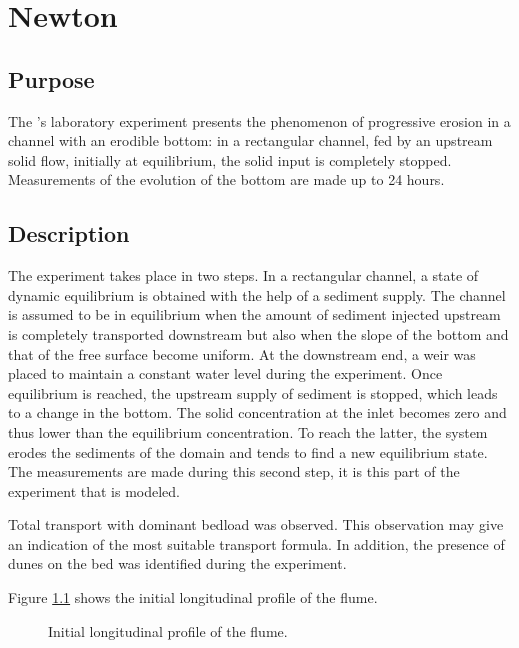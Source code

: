 \chapter{Newton}\label{chapter:Newton}

\section{Purpose}

The \cite{newton1951experimental}'s laboratory experiment presents the phenomenon of 
progressive erosion in a channel with an erodible bottom:
in a rectangular channel, fed by an upstream solid flow, 
initially at equilibrium, the solid input is completely stopped. 
Measurements of the evolution of the bottom are made up to 24 hours.

\section{Description}

The experiment takes place in two steps. In a rectangular channel,
a state of dynamic equilibrium is obtained with the help of
a sediment supply. The channel is assumed to be in equilibrium
when the amount of sediment injected upstream is completely 
transported downstream but also when the slope of the bottom and 
that of the free surface become uniform. At the downstream end, 
a weir was placed to maintain a constant water level during the 
experiment. Once equilibrium is reached, the upstream supply of 
sediment is stopped, which leads to a change in the bottom. The 
solid concentration at the inlet becomes zero and thus lower than 
the equilibrium concentration. To reach the latter, the system 
erodes the sediments of the domain and tends to find a new equilibrium 
state. The measurements are made during this second step, it is this 
part of the experiment that is modeled.

Total transport with dominant bedload was observed. This observation 
may give an indication of the most suitable transport formula. 
In addition, the presence of dunes on the bed was identified during 
the experiment.

Figure \ref{newton:fig:initial} shows the initial longitudinal
profile of the flume.

\begin{figure}[h]
 \centering
 \caption{Initial longitudinal profile of the flume.}
 \label{newton:fig:initial}
\end{figure}

